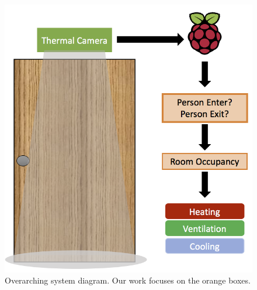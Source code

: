 \documentclass[12pt,oneside]{article} %
\begin{document}
\begin{figure}[!htb]
\centering
\includegraphics[scale=0.4]{images/door.png}
\caption{Overarching system diagram. Our work focuses on the orange boxes.}
\label{door}
\end{figure}

\end{document}
